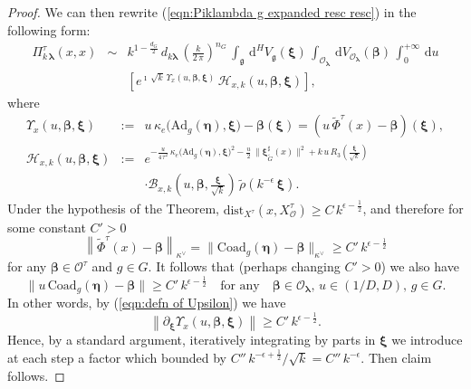 \documentclass[12pt,a4paper]{article}
\theoremstyle{plain}
\theoremstyle{definition}
\begin{document}
\begin{proof}
We can then rewrite (\ref{eqn:Piklambda g expanded resc resc}) in the 
following form:
\begin{eqnarray}
\label{eqn:Piklambda g expanded resc resc xi}
\Pi^\tau_{k\,\boldsymbol{\lambda}}(x,x)&\sim&
%
k^{1-\frac{d_G}{2}}\,d_{k\boldsymbol{\lambda}}\,\left(\frac{k}{2\,\pi}\right)^{n_G}\,
\int_{\mathfrak{g}}\,
\mathrm{d}^HV_{\mathfrak{g}}(\boldsymbol{\xi})\,\int_{\mathcal{O}_{\boldsymbol{\lambda}}}\,
\mathrm{d}
V_{\mathcal{O}_{\boldsymbol{\lambda}}}(\boldsymbol{\beta})
\,\int_0^{+\infty}\,\mathrm{d}u
\nonumber
\\
&&\left[
 e^{\imath\,\sqrt{k}\,\Upsilon_x(u,\boldsymbol{\beta},\boldsymbol{\xi})
}\,\mathcal{H}_{x,k}
\left(u,\boldsymbol{\beta},\boldsymbol{\xi}\right)\right],
\end{eqnarray}
where 
\begin{eqnarray}
\label{eqn:defn of Upsilon}
\Upsilon_x(u,\boldsymbol{\beta},\boldsymbol{\xi})&:=&
u\,\kappa_e\big( \mathrm{Ad}_g(\boldsymbol{\eta}),\boldsymbol{\xi}\big)
-\boldsymbol{\beta}(\boldsymbol{\xi})=\left(u\,
\tilde{\Phi}^\tau(x)-\boldsymbol{\beta}\right)(\boldsymbol{\xi}),
\\
\mathcal{H}_{x,k}
\left(u,\boldsymbol{\beta},\boldsymbol{\xi}\right)&:=&
e^{-\frac{u}{4\,\tau^2}\,\kappa_e\big( \mathrm{Ad}_g(\boldsymbol{\eta}),\boldsymbol{\xi}\big)^2-\frac{u}{2}\,\|\boldsymbol{\xi}^\sharp_{\tilde{G}}(x)\|^2+k\,u\,R_3\left( \frac{\boldsymbol{\xi}}{\sqrt{k}} \right)}
\nonumber
\\
&&\cdot\mathcal{B}_{x,k}\left(u,\boldsymbol{\beta},\frac{\boldsymbol{\xi}}{\sqrt{k}}\right)\,\tilde{\rho}\left(k^{-\epsilon}\,\boldsymbol{\xi}\right).
\nonumber
\end{eqnarray}
Under the hypothesis of the Theorem, 
$\mathrm{dist}_{X^\tau}(x,X^\tau_{\mathcal{O}})
\ge C\,k^{\epsilon-\frac{1}{2}}$, and therefore
for some constant $C'>0$
$$
\left\| \tilde{\Phi}^\tau(x)-\boldsymbol{\beta}  \right\|_{\kappa^\vee}=
\|\mathrm{Coad}_g(\boldsymbol{\eta})-\boldsymbol{\beta}\|_{\kappa^\vee}
\ge C'\,k^{\epsilon-\frac{1}{2}}
$$ for any 
$\boldsymbol{\beta}\in \mathcal{O}^\tau$ and $g\in G$.
It follows that (perhaps changing
$C'>0$) we also have 
\begin{equation}
\label{eqn:distance beta eta g u}
\|u\,\mathrm{Coad}_g(\boldsymbol{\eta})-\boldsymbol{\beta}\|
\ge C'\,k^{\epsilon-\frac{1}{2}}
\quad\text{for any}
\quad\boldsymbol{\beta}\in \mathcal{O}_{\boldsymbol{\lambda}},\,u\in (1/D,D),
\,g\in G.
\end{equation}
%
In other words, by (\ref{eqn:defn of Upsilon}) we have
\begin{equation}
\label{eqn:bound partial xi upsilon}
\left\|\partial_{\boldsymbol{\xi}}\Upsilon_x(u,\boldsymbol{\beta},\boldsymbol{\xi})\right\|\ge 
C'\,k^{\epsilon-\frac{1}{2}}.
\end{equation}
Hence, by a standard argument, iteratively integrating by parts in $\boldsymbol{\xi}$ we introduce at 
each step a factor which bounded by $C''\,k^{-\epsilon+\frac{1}{2}}/
\sqrt{k}=C''\,k^{-\epsilon}$. Then claim follows.




\end{proof}
\end{document}
